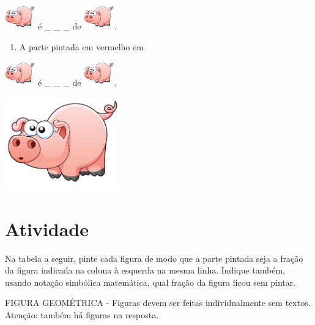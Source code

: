 \documentclass[a4,12pt]{book}
\begin{document}
\includegraphics[height=30pt, keepaspectratio]{pig} é \_ \_ \_   de \includegraphics[height=30pt, keepaspectratio]{pig}.
\begin{enumerate} [\quad a)] %
  \item     A parte pintada em vermelho em
\end{enumerate} %
\includegraphics[height=30pt, keepaspectratio]{pig} é \_ \_ \_   de \includegraphics[height=30pt, keepaspectratio]{pig}.






\includegraphics[width=\textwidth,height=4cm, keepaspectratio]{pig}
\section{Atividade}







Na tabela a seguir, pinte cada figura de modo que a parte pintada seja a fração da figura indicada na coluna à esquerda na mesma linha. Indique também, usando notação simbólica matemática, qual fração da figura ficou sem pintar.
\begin{imagem*}[breakable]{}{}   FIGURA GEOMÉTRICA - Figuras devem ser feitas individualmente sem textos. Atenção: também há figuras na resposta. \end{imagem*}
\end{document}
